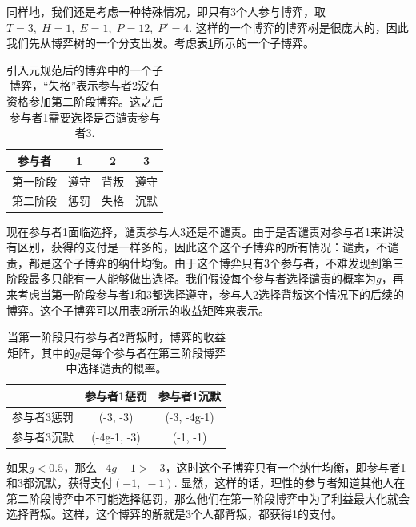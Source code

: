 \documentclass[lang=cn,11pt]{elegantpaper}
\begin{document}
同样地，我们还是考虑一种特殊情况，即只有3个人参与博弈，取$T=3,\;H=1,\;E=1,\;P=12,\;P'=4$. 这样的一个博弈的博弈树是很庞大的，因此我们先从博弈树的一个分支出发。考虑表\ref{tbl:子博弈}所示的一个子博弈。
\begin{table}[htb]
	\centering
	\begin{tabular}{c|ccc}
		参与者 & 1 & 2 & 3 \\
		\hline
		第一阶段 & 遵守 & 背叛 & 遵守 \\
		第二阶段 & 惩罚 & 失格 & 沉默 
	\end{tabular}
	\caption{引入元规范后的博弈中的一个子博弈，“失格”表示参与者2没有资格参加第二阶段博弈。这之后参与者1需要选择是否谴责参与者3.\label{tbl:子博弈}}
\end{table}
现在参与者1面临选择，谴责参与人3还是不谴责。由于是否谴责对参与者1来讲没有区别，获得的支付是一样多的，因此这个这个子博弈的所有情况：谴责，不谴责，都是这个子博弈的纳什均衡。由于这个博弈只有3个参与者，不难发现到第三阶段最多只能有一人能够做出选择。我们假设每个参与者选择谴责的概率为$g$，再来考虑当第一阶段参与者1和3都选择遵守，参与人2选择背叛这个情况下的后续的博弈。这个子博弈可以用表\ref{tbl:收益矩阵}所示的收益矩阵来表示。

\begin{table}[htb] 
	\centering 
	\begin{tabular}{c|cc} 
		& 参与者1惩罚 & 参与者1沉默 \\
		\hline
		参与者3惩罚 & (-3, -3) & (-3, -4g-1)  \\
		参与者3沉默 & (-4g-1, -3) & (-1, -1)
	\end{tabular} 
	\caption{当第一阶段只有参与者2背叛时，博弈的收益矩阵，其中的$g$是每个参与者在第三阶段博弈中选择谴责的概率。\label{tbl:收益矩阵}} 
\end{table}

如果$g<0.5$，那么$-4g-1>-3$，这时这个子博弈只有一个纳什均衡，即参与者1和3都沉默，获得支付$(-1,\;-1)$. 显然，这样的话，理性的参与者知道其他人在第二阶段博弈中不可能选择惩罚，那么他们在第一阶段博弈中为了利益最大化就会选择背叛。这样，这个博弈的解就是3个人都背叛，都获得1的支付。
\end{document}
